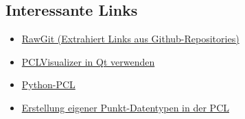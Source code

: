\subsection{Interessante Links}\label{interessante-links}

\begin{itemize}
\tightlist
\item
  \href{http://rawgit.com}{RawGit (Extrahiert Links aus
  Github-Repositories)}
\item
  \href{http://stackoverflow.com/a/11939703/3281871}{PCLVisualizer in Qt
  verwenden}
\item
  \href{https://github.com/strawlab/python-pcl}{Python-PCL}
\item
  \href{pointclouds.org/documentation/tutorials/adding_custom_ptype.php}{Erstellung
  eigener Punkt-Datentypen in der PCL}
\end{itemize}

